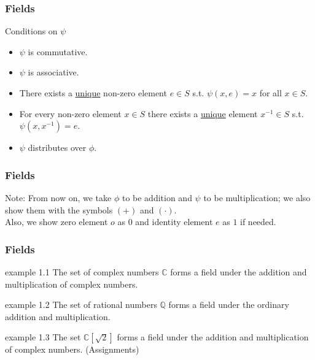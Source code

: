 \documentclass{beamer}
\begin{document}
\begin{frame}
    \frametitle{Fields}
\begin{block}{Conditions on $\psi$}
    \begin{itemize}
        \item $\psi$ is commutative.
        \item <2->$\psi$ is associative.
        \item <3->There exists a \underline{unique} non-zero element $e \in S$ s.t. $\psi(x,e) = x$ for all $x \in S$.
        \item <4->For every non-zero element $x \in S$ there exists a \underline{unique} element $x^{-1} \in S$ s.t. $\psi(x,x^{-1}) = e$.
        \item <5->$\psi$ distributes over $\phi$.
    \end{itemize}
\end{block}
\end{frame}

\begin{frame}
    \frametitle{Fields}
Note: From now on, we take $\phi$ to be addition and $\psi$ to be multiplication; we also show them with the symbols $(+)$ and $(\cdot)$.\\
Also, we show zero element $o$ as $0$ and identity element $e$ as $1$ if needed.
\end{frame}

\begin{frame}
    \frametitle{Fields}

    \begin{exampleblock}{example 1.1}
        The set of complex numbers $\mathbb{C}$ forms a field under the addition and multiplication of complex numbers.
    \end{exampleblock}

    \begin{exampleblock}{example 1.2}
        The set of rational numbers $\mathbb{Q}$ forms a field under the ordinary addition and multiplication.
    \end{exampleblock}

    \begin{exampleblock}{example 1.3}
        The set $\mathbb{C}[\sqrt{2}]$ forms a field under the addition and multiplication of complex numbers. (Assignments)
    \end{exampleblock}

\end{frame}
\end{document}
